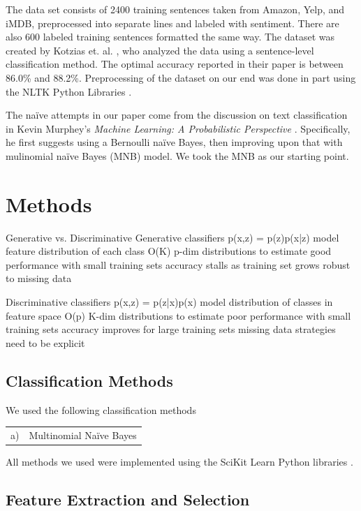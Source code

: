 \documentclass{article} %
\begin{document}
	The data set consists of 2400 training sentences taken from Amazon, Yelp, and iMDB, preprocessed into separate lines and labeled with sentiment. There are also 600 labeled training sentences formatted the same way. The dataset was created by Kotzias et. al. \cite{Kotzias2015}, who analyzed the data using a sentence-level classification method. The optimal accuracy reported in their paper is between 86.0\% and 88.2\%. Preprocessing of the dataset on our end was done in part using the NLTK Python Libraries \cite{nltk}.
	
	The na\"ive attempts in our paper come from the discussion on text classification in Kevin Murphey's \emph{Machine Learning: A Probabilistic Perspective} \cite{Murphy2012}. Specifically, he first suggests using a Bernoulli na\"ive Bayes, then improving upon that with mulinomial na\"ive Bayes (MNB) model. We took the MNB as our starting point. 
	
	
	\section{Methods}
	
	Generative vs. Discriminative
	Generative classifiers
	p(x,z) = p(z)p(x|z)
	model feature distribution of each class 
	O(K) p-dim distributions to estimate 
	good performance with small training sets 
	accuracy stalls as training set grows 
	robust to missing data
	
	
	Discriminative classifiers
	p(x,z) = p(z|x)p(x)
	model distribution of classes in feature space 
	O(p) K-dim distributions to estimate 
	poor performance with small training sets 
	accuracy improves for large training sets 
	missing data strategies need to be explicit
	
	\subsection{Classification Methods}
	
	We used the following classification methods
	
	\begin{tabular}{rl}
		a) & Multinomial Na\"ive Bayes\\
	\end{tabular}

	All methods we used were implemented using the SciKit Learn Python libraries \cite{scikit-learn}. 
	
	\subsection{Feature Extraction and Selection}
	
\end{document}
